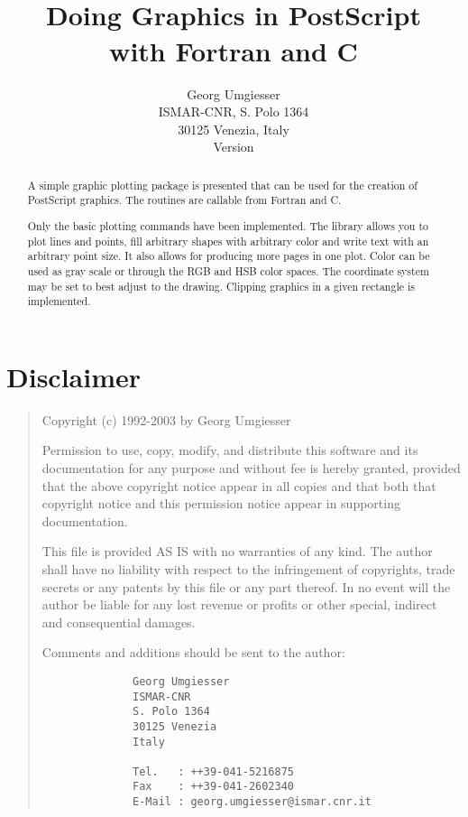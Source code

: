 \documentclass{article}
\title{%
        \psp
        \\Doing Graphics in PostScript
        \\with Fortran and C
        }
\author{%
        Georg Umgiesser
        \\ISMAR-CNR, S. Polo 1364
        \\30125 Venezia, Italy
        \vspace{1cm}
        \\Version \VERSION
        }
\begin{document}
\pagestyle{plain}

\maketitle

\begin{abstract}
A simple graphic plotting package is presented that can be used for
the creation of PostScript graphics. The routines are callable from
Fortran and C.

Only the basic plotting commands have been implemented. The library
allows you to plot lines and points, fill arbitrary shapes
with arbitrary color and write text with an arbitrary point size.
It also allows for producing more pages in one plot. Color can be
used as gray scale or through the RGB and HSB color spaces.
The coordinate system may be set to best adjust to the drawing.
Clipping graphics in a given rectangle is implemented.
\end{abstract}

\thispagestyle{empty}

\newpage

\tableofcontents

\newpage

\section*{Disclaimer}


\begin{quotation}
 
   Copyright (c) 1992-2003 by Georg Umgiesser 
  
   Permission to use, copy, modify, and distribute this software 
   and its documentation for any purpose and without fee is hereby 
   granted, provided that the above copyright notice appear in all 
   copies and that both that copyright notice and this permission 
   notice appear in supporting documentation. 
  
   This file is provided AS IS with no warranties of any kind.
   The author shall have no liability with respect to the
   infringement of copyrights, trade secrets or any patents by
   this file or any part thereof.  In no event will the author
   be liable for any lost revenue or profits or other special,
   indirect and consequential damages.
  
   Comments and additions should be sent to the author:

        \begin{verbatim}
              Georg Umgiesser
              ISMAR-CNR
              S. Polo 1364
              30125 Venezia
              Italy
 
              Tel.   : ++39-041-5216875
              Fax    : ++39-041-2602340
              E-Mail : georg.umgiesser@ismar.cnr.it
        \end{verbatim}
\end{quotation}
\end{document}
